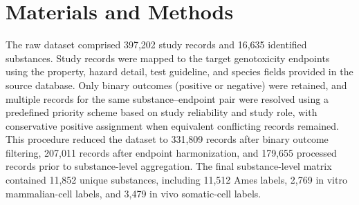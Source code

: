\section{Materials and Methods}

The raw dataset comprised 397,202 study records and 16,635 identified substances. 
Study records were mapped to the target genotoxicity endpoints using the property, hazard detail, test guideline, and species fields provided in the source database. 
Only binary outcomes (positive or negative) were retained, and multiple records for the same substance--endpoint pair were resolved using a predefined priority scheme 
based on study reliability and study role, with conservative positive assignment when equivalent conflicting records remained. This procedure reduced the dataset to 331,809 records 
after binary outcome filtering, 207,011 records after endpoint harmonization, and 179,655 processed records prior to substance-level aggregation. The final substance-level matrix 
contained 11,852 unique substances, including 11,512 Ames labels, 2,769 in vitro mammalian-cell labels, and 3,479 in vivo somatic-cell labels. 